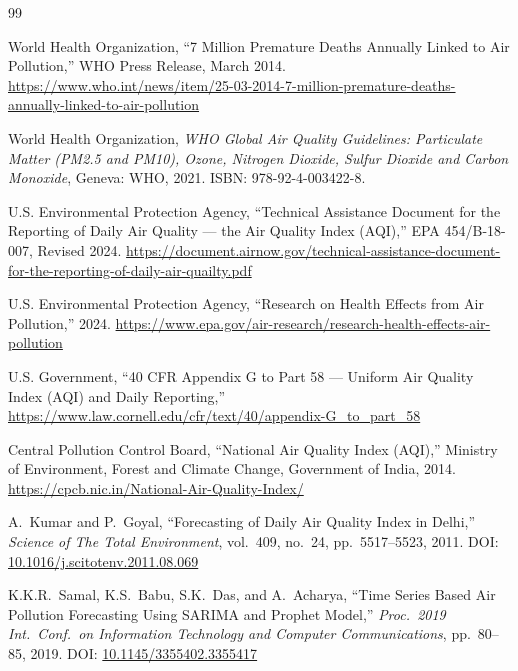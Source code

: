 \documentclass[12pt,a4paper]{report}
\begin{document}
\renewcommand{\bibname}{References}
\begin{thebibliography}{99}

World Health Organization,
``7 Million Premature Deaths Annually Linked to Air Pollution,''
WHO Press Release, March 2014.
\url{https://www.who.int/news/item/25-03-2014-7-million-premature-deaths-annually-linked-to-air-pollution}

World Health Organization,
\textit{WHO Global Air Quality Guidelines: Particulate Matter (PM2.5 and PM10), Ozone, Nitrogen Dioxide, Sulfur Dioxide and Carbon Monoxide},
Geneva: WHO, 2021. ISBN: 978-92-4-003422-8.

U.S. Environmental Protection Agency,
``Technical Assistance Document for the Reporting of Daily Air Quality --- the Air Quality Index (AQI),''
EPA 454/B-18-007, Revised 2024.
\url{https://document.airnow.gov/technical-assistance-document-for-the-reporting-of-daily-air-quailty.pdf}

U.S. Environmental Protection Agency,
``Research on Health Effects from Air Pollution,''
2024. \url{https://www.epa.gov/air-research/research-health-effects-air-pollution}

U.S. Government,
``40 CFR Appendix G to Part 58 --- Uniform Air Quality Index (AQI) and Daily Reporting,''
\url{https://www.law.cornell.edu/cfr/text/40/appendix-G_to_part_58}

Central Pollution Control Board,
``National Air Quality Index (AQI),''
Ministry of Environment, Forest and Climate Change, Government of India, 2014.
\url{https://cpcb.nic.in/National-Air-Quality-Index/}

A.~Kumar and P.~Goyal,
``Forecasting of Daily Air Quality Index in Delhi,''
\textit{Science of The Total Environment}, vol.~409, no.~24, pp.~5517--5523, 2011.
DOI: \href{https://doi.org/10.1016/j.scitotenv.2011.08.069}{10.1016/j.scitotenv.2011.08.069}

K.K.R.~Samal, K.S.~Babu, S.K.~Das, and A.~Acharya,
``Time Series Based Air Pollution Forecasting Using SARIMA and Prophet Model,''
\textit{Proc.\ 2019 Int.\ Conf.\ on Information Technology and Computer Communications}, pp.~80--85, 2019.
DOI: \href{https://doi.org/10.1145/3355402.3355417}{10.1145/3355402.3355417}


\end{thebibliography}
\end{document}
